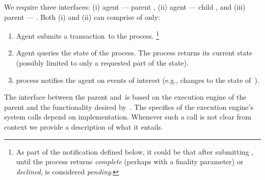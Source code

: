 We require three interfaces: (i) \nameAbbr agent --- parent \smr, (ii) \nameAbbr agent --- child \smr, and (iii) parent \smr --- \sa. Both (i) and (ii) can comprise of only:
\begin{enumerate}
    \item Agent submits a transaction~\tx to the \smr process.%
    \footnote{As part of the notification defined below, it could be that after submitting \tx, until the \smr process returns \textit{complete} (perhaps with a finality parameter) or \textit{declined}, \tx is considered \textit{pending}.}
    \item Agent queries the state of the \smr process. The \smr process returns its current state (possibly limited to only a requested part of the state).
    \item \smr process notifies the agent on events of interest (e.g., changes to the state of~\sa).
\end{enumerate}

The interface between the parent \smr and~\sa is based on the execution engine of the parent \smr and the functionality desired by~\sa. The specifics of the execution engine's system calls depend on implementation. Whenever such a call is not clear from context we provide a description of what it entails. 

